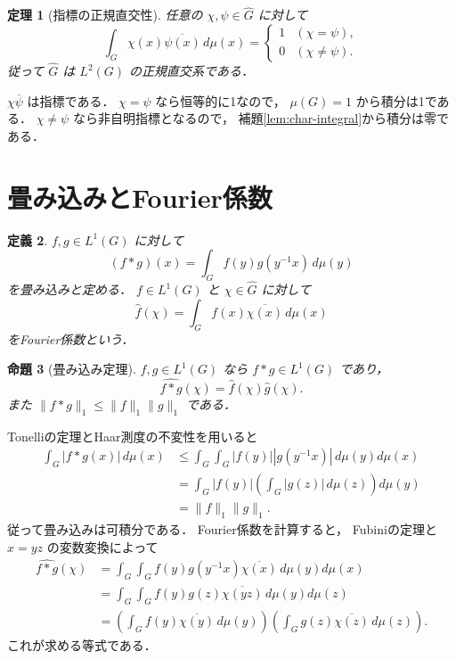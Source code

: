 \documentclass[a5paper,10pt,onecolumn]{jsarticle}
\makeatletter
\theoremstyle{mathnotetheorem}
\newtheorem{theorem}{定理}[section]
\newtheorem{definition}[theorem]{定義}
\newtheorem{proposition}[theorem]{命題}
\renewcommand{\proofname}{証明}
\renewenvironment{proof}[1][\proofname]{%
  \par\pushQED{\qed}\normalfont\topsep4\p@\@plus2\p@\relax
  \trivlist\item[\hskip\labelsep\bfseries #1]\ignorespaces
}{\popQED\endtrivlist\@endpefalse}
\newcommand{\norm}[1]{\lVert #1\rVert}
\makeatother
\begin{document}
\begin{theorem}[指標の正規直交性]\label{thm:orthogonal}
任意の $\chi,\psi\in\widehat G$ に対して
\[
 \int_G\chi(x)\overline{\psi(x)}\,d\mu(x)
 =\begin{cases}1&(\chi=\psi),\\0&(\chi\ne\psi).\end{cases}
\]
従って $\widehat G$ は $L^2(G)$ の正規直交系である．
\end{theorem}
\begin{proof}
$\chi\overline\psi$ は指標である．
$\chi=\psi$ なら恒等的に1なので，
$\mu(G)=1$ から積分は1である．
$\chi\ne\psi$ なら非自明指標となるので，
補題\ref{lem:char-integral}から積分は零である．
\end{proof}

\section{畳み込みとFourier係数}

\begin{definition}
$f,g\in L^1(G)$ に対して
\[
 (f*g)(x)=\int_Gf(y)g(y^{-1}x)\,d\mu(y)
\]
を畳み込みと定める．
$f\in L^1(G)$ と $\chi\in\widehat G$ に対して
\[
 \widehat f(\chi)=
 \int_Gf(x)\overline{\chi(x)}\,d\mu(x)
\]
をFourier係数という．
\end{definition}

\begin{proposition}[畳み込み定理]\label{prop:conv}
$f,g\in L^1(G)$ なら $f*g\in L^1(G)$ であり，
\[
 \widehat{f*g}(\chi)
 =\widehat f(\chi)\widehat g(\chi).
\]
また $\norm{f*g}_1\le\norm f_1\norm g_1$ である．
\end{proposition}
\begin{proof}
Tonelliの定理とHaar測度の不変性を用いると
\begin{align*}
 \int_G|f*g(x)|\,d\mu(x)
 &\le\int_G\int_G
 |f(y)||g(y^{-1}x)|\,d\mu(y)d\mu(x)\\
 &=\int_G|f(y)|\left(\int_G|g(z)|\,d\mu(z)\right)d\mu(y)\\
 &=\norm f_1\norm g_1.
\end{align*}
従って畳み込みは可積分である．
Fourier係数を計算すると，
Fubiniの定理と $x=yz$ の変数変換によって
\begin{align*}
 \widehat{f*g}(\chi)
 &=\int_G\int_G
 f(y)g(y^{-1}x)\overline{\chi(x)}\,d\mu(y)d\mu(x)\\
 &=\int_G\int_G
 f(y)g(z)\overline{\chi(yz)}\,d\mu(y)d\mu(z)\\
 &=\left(\int_Gf(y)\overline{\chi(y)}\,d\mu(y)\right)
 \left(\int_Gg(z)\overline{\chi(z)}\,d\mu(z)\right).
\end{align*}
これが求める等式である．
\end{proof}
\end{document}

